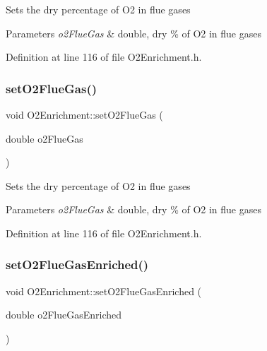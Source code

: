 Sets the dry percentage of O2 in flue gases 
\begin{DoxyParams}{Parameters}
{\em o2\+Flue\+Gas} & double, dry \% of O2 in flue gases \\
\hline
\end{DoxyParams}


Definition at line 116 of file O2\+Enrichment.\+h.

\mbox{\label{class_o2_enrichment_aef67aa13531717c0d1832921ce6d27ae}} 
\subsubsection{\texorpdfstring{set\+O2\+Flue\+Gas()}{setO2FlueGas()}\hspace{0.1cm}{\footnotesize\ttfamily [3/3]}}
{\footnotesize\ttfamily void O2\+Enrichment\+::set\+O2\+Flue\+Gas (\begin{DoxyParamCaption}\item[{double}]{o2\+Flue\+Gas }\end{DoxyParamCaption})\hspace{0.3cm}{\ttfamily [inline]}}

Sets the dry percentage of O2 in flue gases 
\begin{DoxyParams}{Parameters}
{\em o2\+Flue\+Gas} & double, dry \% of O2 in flue gases \\
\hline
\end{DoxyParams}


Definition at line 116 of file O2\+Enrichment.\+h.

\mbox{\label{class_o2_enrichment_a9866f25fe54e561579079ee1a3889c2d}} 
\subsubsection{\texorpdfstring{set\+O2\+Flue\+Gas\+Enriched()}{setO2FlueGasEnriched()}\hspace{0.1cm}{\footnotesize\ttfamily [1/3]}}
{\footnotesize\ttfamily void O2\+Enrichment\+::set\+O2\+Flue\+Gas\+Enriched (\begin{DoxyParamCaption}\item[{double}]{o2\+Flue\+Gas\+Enriched }\end{DoxyParamCaption})\hspace{0.3cm}{\ttfamily [inline]}}

